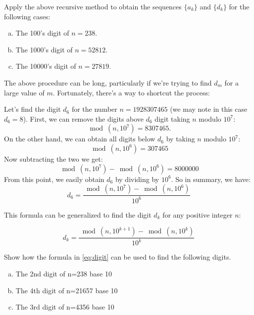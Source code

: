 \begin{exercise}\label{exercise:bases:recursive method}
Apply the above recursive method to obtain the sequences $\{a_k\}$ and $\{d_k\}$ for the following cases:
\begin{enumerate}[(a)]
\item The 100's digit of $n=238$.
\item The 1000's digit of $n=52812$.
\item The 10000's digit of $ n=27819$.
\end{enumerate}
\end{exercise}


The above procedure can be long, particularly if we're trying to find $d_m$ for a large value of $m$.  Fortunately, there's a way to shortcut the process:

\begin{example}\label{example:bases:k'th-dig}
Let's find the digit $d_6$ for the number $n=1928307465$ (we may note in this case $d_6=8$). First, we can remove the digits above $d_6$ digit taking $n$ modulo $10^7$:
\begin{equation*}
\bmod(n,10^{7})=8307465.
\end{equation*}
On the other hand, we can obtain all digits below $d_6$ by taking $n$ modulo $10^7$:
\begin{equation*}
\bmod(n,10^{6})=307465
\end{equation*}
Now subtracting the two we get:
\begin{equation*}
\bmod(n,10^{7}) - \bmod(n,10^{6})=8000000
\end{equation*}
From this point, we easily obtain $d_6$ by dividing by $10^6$.  So in summary, we have:
\begin{equation*}
d_6 = \frac{\bmod(n,10^7)-\bmod(n,10^6)}{10^6} 
\end{equation*}

\end{example}

This formula can be generalized to find the digit $d_k$ for any positive integer $n$:

\begin{equation}\label{eq:digit}
d_{k}=\frac{\bmod(n,10^{k+1})-\bmod(n,10^{k})}{10^{k}}
\end{equation}

\begin{exercise}\label{exercise:bases:formula for k'th digit}
Show how the formula in \eqref{eq:digit} can be used to find the following digits.
\begin{enumerate}[(a)]
\item The 2nd digit of n=238 base 10
\item The 4th digit of n=21657 base 10
\item The 3rd digit of n=4356 base 10
\end{enumerate}
\end{exercise}

